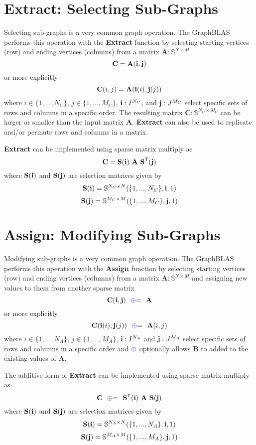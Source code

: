 \section{Extract: Selecting Sub-Graphs}
  Selecting sub-graphs is a very common graph operation.  The GraphBLAS performs this operation with the {\bf Extract} function by selecting starting vertices (row) and ending vertices (columns) from a matrix $\mathbf{A} : \mathbb{S}^{N \times M}$
$$
   \mathbf{C}= \mathbf{A}({\bf i},{\bf j})
$$
or more explicitly
$$
   {\bf C}(i,j) = {\bf A}({\bf i}(i),{\bf j}(j))
$$
where $i \in \{1,...,N_C\}$, $j \in \{1,...,M_C\}$, ${\bf i} : I^{N_C}$, and ${\bf j}: J^{M_C}$  select specific sets of rows and columns in a specific order.   The resulting matrix $\mathbf{C} : \mathbb{S}^{N_C \times M_C}$ can be larger or smaller than the input matrix $\mathbf{A}$.  {\bf Extract} can also be used to replicate and/or permute rows and columns in a matrix.

  {\bf Extract} can be implemented using sparse matrix multiply as
$$
   \mathbf{C}= \mathbf{S}({\bf i}) ~ \mathbf{A} ~ \mathbf{S}^{\sf T}({\bf j})
$$
where $\mathbf{S}({\bf i})$ and $\mathbf{S}({\bf j})$ are selection matrices given by
$$
   \mathbf{S}({\bf i}) = \mathbb{S}^{N_C \times N}(\{1,...,N_C\},{\bf i},1)
$$
$$
    \mathbf{S}({\bf j}) = \mathbb{S}^{M_C \times M}(\{1,...,M_C\},{\bf j},1)
$$


\section{Assign: Modifying Sub-Graphs}
  Modifying sub-graphs is a very common graph operation.  The GraphBLAS performs this operation with the {\bf Assign} function by selecting starting vertices (row) and ending vertices (columns) from a matrix $\mathbf{A} : \mathbb{S}^{N \times M}$ and assigning new values to them from another sparse matrix
$$
   \mathbf{C}({\bf i},{\bf j}) ~~ {\textcolor{blue}{\oplus}}{=} ~~ \mathbf{A}
$$
or more explicitly
$$
   {\bf C}({\bf i}(i),{\bf j}(j)) ~~ {\textcolor{blue}{\oplus}}{=} ~~{\bf A}(i,j) 
$$
where $i \in \{1,...,N_A\}$, $j \in \{1,...,M_A\}$, ${\bf i} : I^{N_A}$ and ${\bf j}: J^{M_A}$ select specific sets of rows and columns in a specific order and ${\textcolor{blue}{\oplus}}$ optionally allows $\mathbf{B}$ to added to the existing values of $\mathbf{A}$. 

  The additive form of {\bf Extract} can be implemented using sparse matrix multiply as
$$
   \mathbf{C} ~~ {\oplus}{=} ~~ \mathbf{S}^{\sf T}({\bf i}) ~ \mathbf{A} ~ \mathbf{S}({\bf j})
$$
where $\mathbf{S}({\bf i})$ and $\mathbf{S}({\bf j})$ are selection matrices given by
$$
   \mathbf{S}({\bf i}) = \mathbb{S}^{N_A \times N}(\{1,...,N_A\},{\bf i},1)
$$
$$
    \mathbf{S}({\bf j}) = \mathbb{S}^{M_A \times M}(\{1,...,M_A\},{\bf j},1)
$$
  

